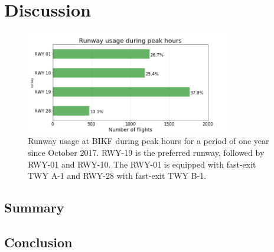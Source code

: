 


\chapter{Discussion}



\begin{figure}[h]
    \centering
    \includegraphics[width=0.8\textwidth]{graphics/fig_runway_usage_peak.png}
    \caption[Runway usage at BIKF during peak hours]{Runway usage at BIKF during peak hours for a period of one year since October 2017. RWY-19 is the preferred runway, followed by RWY-01 and RWY-10. The RWY-01 is equipped with fast-exit TWY A-1 and RWY-28 with fast-exit TWY B-1.}
    \label{fig:runway_usage_peak}
\end{figure}




\section{Summary}

\section{Conclusion\label{sec:conclusions}}
